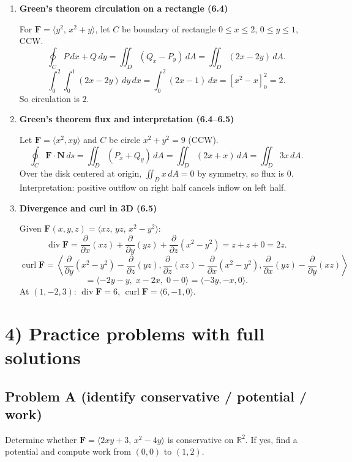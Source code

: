 \documentclass[12pt, twoside]{article}
\begin{document}
\begin{enumerate}[leftmargin=*, itemsep=1em]
Compute cross-partials on the domain: $P_y=Q_x$ (they match). But the domain is not simply connected (punctured plane).
Use closed unit circle $\mathbf{r}(t)=\langle\cos t,\sin t\rangle$:
\[
\mathbf{F}(\mathbf{r}(t))=\langle-\sin t,\cos t\rangle,
\quad \mathbf{r}'(t)=\langle-\sin t,\cos t\rangle,
\]
\[
\oint_C\mathbf{F}\cdot d\mathbf{r}=\int_0^{2\pi}1\,dt=2\pi\ne0.
\]
Therefore the field is \textbf{not conservative} on this domain.

\item \textbf{Green's theorem circulation on a rectangle (6.4)}

For $\mathbf{F}=\langle y^2,\,x^2+y\rangle$, let $C$ be boundary of rectangle $0\le x\le2$, $0\le y\le1$, CCW.
\[
\oint_C P\,dx+Q\,dy=\iint_D(Q_x-P_y)\,dA=
\iint_D(2x-2y)\,dA.
\]
\[
\int_0^2\int_0^1(2x-2y)\,dy\,dx
=\int_0^2(2x-1)\,dx=[x^2-x]_0^2=2.
\]
So circulation is $2$.

\item \textbf{Green's theorem flux and interpretation (6.4--6.5)}

Let $\mathbf{F}=\langle x^2,xy\rangle$ and $C$ be circle $x^2+y^2=9$ (CCW).
\[
\oint_C\mathbf{F}\cdot\mathbf{N}\,ds
=\iint_D(P_x+Q_y)\,dA=
\iint_D(2x+x)\,dA=
\iint_D 3x\,dA.
\]
Over the disk centered at origin, $\iint_D x\,dA=0$ by symmetry, so flux is $0$.
Interpretation: positive outflow on right half cancels inflow on left half.

\item \textbf{Divergence and curl in 3D (6.5)}

Given $\mathbf{F}(x,y,z)=\langle xz,\,yz,\,x^2-y^2\rangle$:
\[
\operatorname{div}\mathbf{F}=\frac{\partial}{\partial x}(xz)+\frac{\partial}{\partial y}(yz)+\frac{\partial}{\partial z}(x^2-y^2)=z+z+0=2z.
\]
\[
\operatorname{curl}\mathbf{F}=\left\langle
\frac{\partial}{\partial y}(x^2-y^2)-\frac{\partial}{\partial z}(yz),
\frac{\partial}{\partial z}(xz)-\frac{\partial}{\partial x}(x^2-y^2),
\frac{\partial}{\partial x}(yz)-\frac{\partial}{\partial y}(xz)
\right\rangle
\]
\[
=\langle -2y-y,\;x-2x,\;0-0\rangle=\langle -3y,-x,0\rangle.
\]
At $(1,-2,3)$: $\operatorname{div}\mathbf{F}=6$, $\operatorname{curl}\mathbf{F}=\langle6,-1,0\rangle$.
\end{enumerate}

\section*{4) Practice problems with full solutions}

\subsection*{Problem A (identify conservative / potential / work)}
Determine whether $\mathbf{F}=\langle 2xy+3,\,x^2-4y\rangle$ is conservative on $\mathbb{R}^2$. If yes, find a potential and compute work from $(0,0)$ to $(1,2)$.
\end{document}
